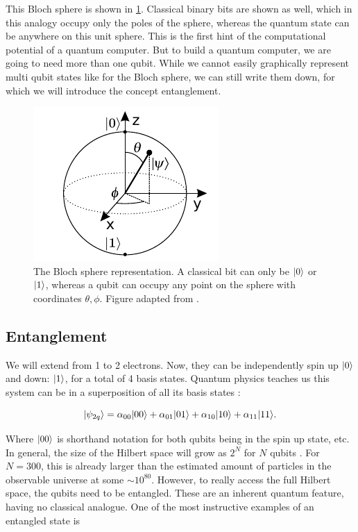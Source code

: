 This Bloch sphere is shown in \cref{fig:BlochSphere}. Classical binary bits are shown as well, which in this analogy occupy only the poles of the sphere, whereas the quantum state can be anywhere on this unit sphere. This is the first hint of the computational potential of a quantum computer. But to build a quantum computer, we are going to need more than one qubit. While we cannot easily graphically represent multi qubit states like for the Bloch sphere, we can still write them down, for which we will introduce the concept entanglement.

\begin{figure}
	\centering
	\includegraphics[width=.28\linewidth]{figures/BlochSphereCropped.pdf}
	\caption{The Bloch sphere representation. A classical bit can only be $\lvert0\rangle$ or $\lvert1\rangle$, whereas a qubit can occupy any point on the sphere with coordinates $\theta, \phi$. Figure adapted from \cite{Jones2012}.}
	\label{fig:BlochSphere}
\end{figure}

\subsection{Entanglement}\label{sub:Entanglement}

We will extend from 1 to 2 electrons. Now, they can be independently spin up $\lvert0\rangle$ and down: $\lvert1\rangle$, for a total of 4 basis states. Quantum physics teaches us this system can be in a superposition of all its basis states \cite{Nielsen2011}:

\begin{equation}\label{eq:TwoQubits}
	\lvert\psi_{2q}\rangle = 
	\alpha_{00} \lvert00\rangle + \alpha_{01} \lvert01\rangle + \alpha_{10} \lvert10\rangle + \alpha_{11} \lvert11\rangle.
\end{equation}

Where $\lvert00\rangle$ is shorthand notation for both qubits being in the spin up state, etc. In general, the size of the Hilbert space will grow as $2^N$ for $N$ qubits \cite{Henriet2020,Nielsen2011}. For $N=300$, this is already larger than the estimated amount of particles in the observable universe at some $\sim 10^{80}$. However, to really access the full Hilbert space, the qubits need to be entangled. These are an inherent quantum feature, having no classical analogue. One of the most instructive examples of an entangled state is 

